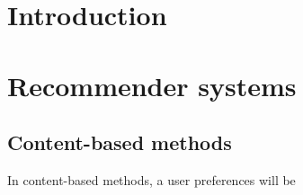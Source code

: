 \documentclass[a4paper]{article}
\begin{document}
\section{Introduction}

\section{Recommender systems}

\subsection{Content-based methods}
In content-based methods, a user preferences will be 
\end{document}
